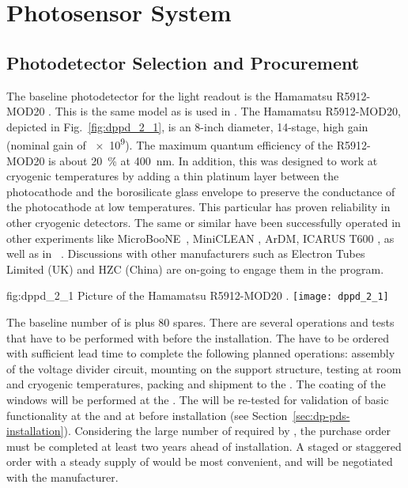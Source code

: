 \section{Photosensor System}
\label{sec:dp-pds-photosensors}

\subsection{Photodetector Selection and Procurement}
\label{sec:dp-pds-selection-procurement}

The baseline photodetector for the light readout is the Hamamatsu R5912-MOD20 . This is the same model as is used in . The Hamamatsu R5912-MOD20, depicted in  Fig.~\ref{fig:dppd_2_1}, is an 8-inch diameter, 14-stage, high gain  (nominal gain of \num{e9}). The maximum quantum efficiency of the R5912-MOD20  is about \SI{20}{\%} at \SI{400}{\nano\m}. In addition, this  was designed to work at cryogenic temperatures by adding a thin platinum layer between the photocathode and the borosilicate glass envelope to preserve the conductance of the photocathode at low temperatures. This particular  has proven reliability in other cryogenic detectors. The same or similar  have been successfully operated in other \lar experiments like MicroBooNE~\cite{microboone}, MiniCLEAN \cite{miniclean}, ArDM, ICARUS T600 \cite{icarus}, as well as in ~\cite{protoDUNDP-tdr}. Discussions with other manufacturers such as Electron Tubes Limited (UK) \cite{electrontubeslim} and HZC (China) \cite{hzc} are on-going to engage them in the program.

\begin{dunefigure}{fig:dppd_2_1}
{Picture of the Hamamatsu R5912-MOD20  \cite{hamamatsu-5912}.}
\texttt{[image: dppd\_2\_1]}
\end{dunefigure}

The baseline number of  is \dpnumpmtch plus \num{80} spares.  There are several operations and tests that have to be performed with  before the installation. The  have to be ordered with sufficient lead time to complete the following planned operations: assembly of the voltage divider circuit, mounting on the support structure, testing at room and cryogenic temperatures, packing and shipment to the . The  coating of the  windows will be performed at the . The  will be re-tested for validation of basic functionality at the  and at \surf before installation (see Section~\ref{sec:dp-pds-installation}). Considering the large number of  required by \dual {}, the purchase order must be completed at least two years ahead of installation. A staged or staggered order with a steady supply of  would be most convenient, and will be negotiated with the manufacturer.

